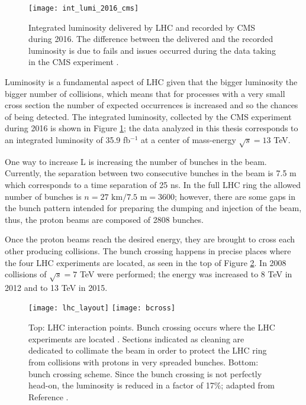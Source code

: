 \begin{figure}[!h]
\centering
\texttt{[image: int\_lumi\_2016\_cms]}
\caption [Integrated luminosity delivered by LHC and recorded by CMS during 2016]{Integrated luminosity delivered by LHC and recorded by CMS during 2016. The difference between the delivered and the recorded luminosity is due to fails and issues occurred during the data taking in the CMS experiment \cite{lumi}.}\label{fig:lumi}
\end{figure}

Luminosity is a fundamental aspect of LHC given that the bigger luminosity the bigger number of collisions, which means that for processes with a very small cross section the number of expected occurrences is increased and so the chances of being detected. The integrated luminosity, collected by the CMS experiment during 2016 is shown in Figure \ref{fig:lumi}; the data analyzed in this thesis corresponds to an integrated luminosity of 35.9 fb$^{-1}$ at a center of mass-energy $\sqrt{s}=13$ TeV.

One way to increase L is increasing the number of bunches in the beam. Currently, the separation between two consecutive bunches in the beam is 7.5 m which corresponds to a time separation of 25 ns. In the full LHC ring the allowed number of bunches is $n=27\textrm{ km}/7.5\textrm{ m}=3600$; however, there are some gaps in the bunch pattern intended for preparing the dumping and injection of the beam, thus, the proton beams are composed of 2808 bunches.

Once the proton beams reach the desired energy, they are brought to cross each other producing \pp collisions. The bunch crossing happens in precise places where the four LHC experiments are located, as seen in the top of Figure \ref{fig:lhc_layout}. In 2008 \pp collisions of $\sqrt{s}=7$ TeV were performed; the energy was increased to 8 TeV in 2012 and to 13 TeV in 2015.

\begin{figure}[!h]
\centering
\texttt{[image: lhc\_layout]}
\texttt{[image: bcross]}
\caption [LHC interaction points]{Top: LHC interaction points. Bunch crossing occurs where the LHC experiments are located \cite{lhc_layout}. Sections indicated as cleaning are dedicated to collimate the beam in order to protect the LHC ring from collisions with protons in very spreaded bunches. Bottom: bunch crossing scheme. Since the bunch crossing is not perfectly head-on, the luminosity is reduced in a factor of 17\%; adapted from Reference \cite{l1}.}\label{fig:lhc_layout}
\end{figure}

